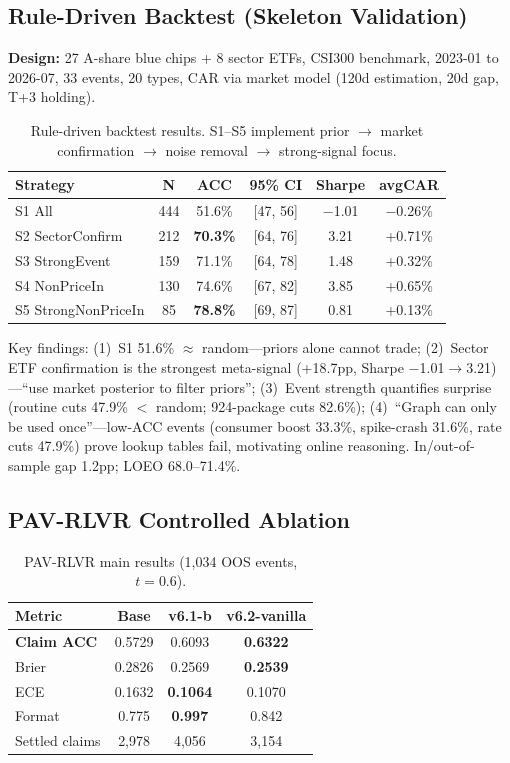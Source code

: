 \documentclass[sigconf, anonymous, review]{acmart}
\begin{document}
\subsection{Rule-Driven Backtest (Skeleton Validation)}

\textbf{Design:} 27 A-share blue chips + 8 sector ETFs, CSI300 benchmark, 2023-01 to 2026-07, 33 events, 20 types, CAR via market model (120d estimation, 20d gap, T+3 holding).

\begin{table}[t]
\centering\small
\caption{Rule-driven backtest results. S1--S5 implement prior $\to$ market confirmation $\to$ noise removal $\to$ strong-signal focus.}
\label{tab:backtest}
\begin{tabular}{@{}lccccc@{}}
\toprule
Strategy & N & ACC & 95\% CI & Sharpe & avgCAR \\
\midrule
S1 All & 444 & 51.6\% & [47, 56] & $-$1.01 & $-$0.26\% \\
S2 SectorConfirm & 212 & \textbf{70.3\%} & [64, 76] & 3.21 & +0.71\% \\
S3 StrongEvent & 159 & 71.1\% & [64, 78] & 1.48 & +0.32\% \\
S4 NonPriceIn & 130 & 74.6\% & [67, 82] & 3.85 & +0.65\% \\
S5 StrongNonPriceIn & 85 & \textbf{78.8\%} & [69, 87] & 0.81 & +0.13\% \\
\bottomrule
\end{tabular}
\end{table}

Key findings: (1)~S1 51.6\% $\approx$ random---priors alone cannot trade; (2)~Sector ETF confirmation is the strongest meta-signal (+18.7pp, Sharpe $-$1.01$\to$3.21)---``use market posterior to filter priors''; (3)~Event strength quantifies surprise (routine cuts 47.9\% $<$ random; 924-package cuts 82.6\%); (4)~``Graph can only be used once''---low-ACC events (consumer boost 33.3\%, spike-crash 31.6\%, rate cuts 47.9\%) prove lookup tables fail, motivating online reasoning. In/out-of-sample gap 1.2pp; LOEO 68.0--71.4\%.

\subsection{PAV-RLVR Controlled Ablation}
\label{sec:ablation}

\begin{table}[t]
\centering\small
\caption{PAV-RLVR main results (1,034 OOS events, $t=0.6$).}
\label{tab:main}
\begin{tabular}{@{}lccc@{}}
\toprule
Metric & Base & v6.1-b & v6.2-vanilla \\
\midrule
\textbf{Claim ACC} & 0.5729 & 0.6093 & \textbf{0.6322} \\
Brier & 0.2826 & 0.2569 & \textbf{0.2539} \\
ECE & 0.1632 & \textbf{0.1064} & 0.1070 \\
Format & 0.775 & \textbf{0.997} & 0.842 \\
Settled claims & 2,978 & 4,056 & 3,154 \\
\bottomrule
\end{tabular}
\end{table}
\end{document}
